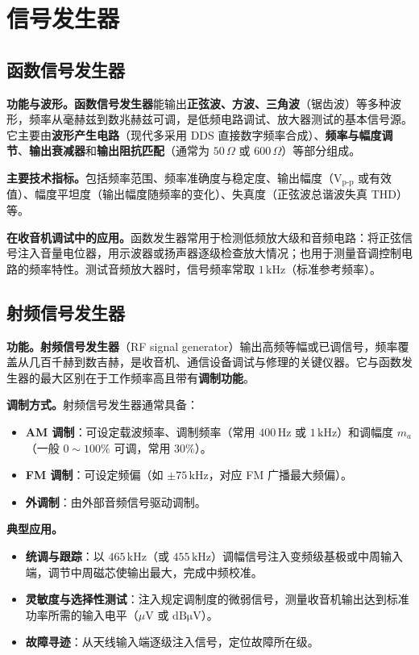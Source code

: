 \documentclass[12pt,UTF8]{ctexbook}
\begin{document}
\section{信号发生器}
\label{sec:signal_generator}

\subsection{函数信号发生器}

\textbf{功能与波形。}\textbf{函数信号发生器}能输出\textbf{正弦波、方波、三角波}（锯齿波）等多种波形，频率从毫赫兹到数兆赫兹可调，是低频电路调试、放大器测试的基本信号源。它主要由\textbf{波形产生电路}（现代多采用 DDS 直接数字频率合成）、\textbf{频率与幅度调节}、\textbf{输出衰减器}和\textbf{输出阻抗匹配}（通常为 $50\,\Omega$ 或 $600\,\Omega$）等部分组成。

\textbf{主要技术指标。}包括频率范围、频率准确度与稳定度、输出幅度（$\mathrm{V_{p\text{-}p}}$ 或有效值）、幅度平坦度（输出幅度随频率的变化）、失真度（正弦波总谐波失真 THD）等。

\textbf{在收音机调试中的应用。}函数发生器常用于检测低频放大级和音频电路：将正弦信号注入音量电位器，用示波器或扬声器逐级检查放大情况；也用于测量音调控制电路的频率特性。测试音频放大器时，信号频率常取 $1\,\mathrm{kHz}$（标准参考频率）。

\subsection{射频信号发生器}

\textbf{功能。}\textbf{射频信号发生器}（RF signal generator）输出高频等幅或已调信号，频率覆盖从几百千赫到数吉赫，是收音机、通信设备调试与修理的关键仪器。它与函数发生器的最大区别在于工作频率高且带有\textbf{调制功能}。

\textbf{调制方式。}射频信号发生器通常具备：
\begin{itemize}
  \item \textbf{AM 调制}：可设定载波频率、调制频率（常用 $400\,\mathrm{Hz}$ 或 $1\,\mathrm{kHz}$）和调幅度 $m_a$（一般 $0\sim 100\%$ 可调，常用 $30\%$）。
  \item \textbf{FM 调制}：可设定频偏（如 $\pm 75\,\mathrm{kHz}$，对应 FM 广播最大频偏）。
  \item \textbf{外调制}：由外部音频信号驱动调制。
\end{itemize}

\textbf{典型应用。}
\begin{itemize}
  \item \textbf{统调与跟踪}：以 $465\,\mathrm{kHz}$（或 $455\,\mathrm{kHz}$）调幅信号注入变频级基极或中周输入端，调节中周磁芯使输出最大，完成中频校准。
  \item \textbf{灵敏度与选择性测试}：注入规定调制度的微弱信号，测量收音机输出达到标准功率所需的输入电平（$\mu\mathrm{V}$ 或 $\mathrm{dB\mu V}$）。
  \item \textbf{故障寻迹}：从天线输入端逐级注入信号，定位故障所在级。
\end{itemize}
\end{document}
